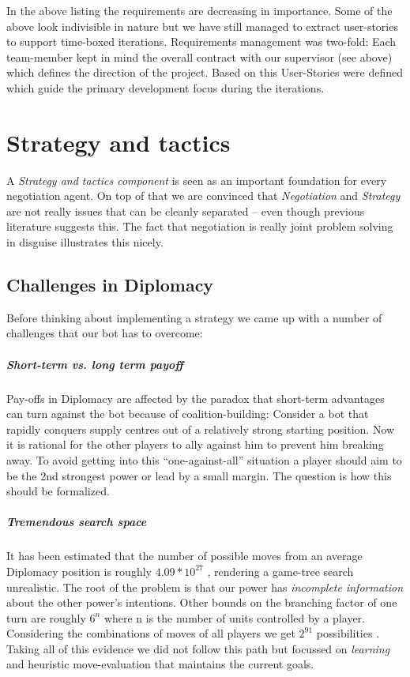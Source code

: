 \documentclass[pdftex,11pt,a4paper]{report}
\begin{document}
In the above listing the requirements are decreasing in
importance. Some of the above look indivisible in nature but we have
still managed to extract user-stories to support time-boxed
iterations. Requirements management was two-fold: Each
team-member kept in mind the overall contract with our supervisor (see
above) which defines the direction of the project.  Based on this
User-Stories were defined which guide the primary development focus
during the iterations.


\pagebreak

\chapter{Strategy and tactics}

A \textit{Strategy and tactics component} is seen as an important
foundation for every negotiation agent. On top of that we are 
convinced that \textit{Negotiation} and \textit{Strategy} are not
really issues that can be cleanly separated -- even though previous
literature suggests this. The fact that negotiation is really
joint problem solving in disguise illustrates this nicely.

\section{Challenges in Diplomacy}

Before thinking about implementing a strategy we came up with
a number of challenges that our bot has to overcome:

\paragraph{Short-term vs. long term payoff}
Pay-offs in Diplomacy are affected by the paradox that short-term
advantages can turn against the bot because of coalition-building:
Consider a bot that rapidly conquers supply centres out of a 
relatively strong starting position. Now it is rational for the
other players to ally against him to prevent him breaking away.
To avoid getting into this ``one-against-all'' situation a player
should aim to be the 2nd strongest power or lead by a small margin.
The question is how this should be formalized.

\paragraph{Tremendous search space}
It has been estimated that the number of possible moves from
an average Diplomacy position is roughly $4.09 * 10^{27}$ 
\cite{Kemmerling00}, rendering a game-tree search unrealistic. The root
of the problem is that our power has \textit{incomplete information} 
about the other power's intentions. Other bounds on the branching factor
of one turn are roughly $6^{n}$ where n is the number of units controlled by a
player. Considering the combinations of moves of all players we get
$2^{91}$ possibilities \cite{Shapiro02}. Taking all of this evidence we
did not follow this path but focussed on \textit{learning} and heuristic move-evaluation
that maintains the current goals.
\end{document}

